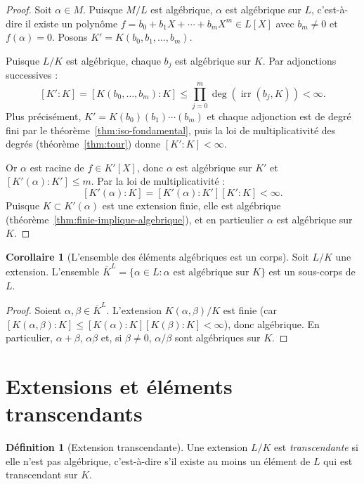 \documentclass[12pt,a4paper,openany]{book}
\theoremstyle{definition}
\newtheorem{definition}{Définition}[chapter]
\newtheorem{corollaire}{Corollaire}[chapter]
\newcommand{\irr}{\operatorname{irr}}
\renewcommand{\deg}{\operatorname{deg}}
\begin{document}
\begin{proof}
Soit $\alpha \in M$. Puisque $M/L$ est algébrique, $\alpha$ est algébrique sur
$L$, c'est-à-dire il existe un polynôme
$f = b_0 + b_1 X + \cdots + b_m X^m \in L[X]$ avec $b_m \neq 0$ et
$f(\alpha) = 0$. Posons $K' = K(b_0, b_1, \dots, b_m)$.

Puisque $L/K$ est algébrique, chaque $b_j$ est algébrique sur $K$. Par
adjonctions successives :
\[
  [K':K] = [K(b_0, \dots, b_m):K] \leq \prod_{j=0}^{m} \deg(\irr(b_j, K)) < \infty.
\]
Plus précisément, $K' = K(b_0)(b_1)\cdots(b_m)$ et chaque adjonction est de
degré fini par le théorème~\ref{thm:iso-fondamental}, puis la loi de
multiplicativité des degrés (théorème~\ref{thm:tour}) donne $[K':K] < \infty$.

Or $\alpha$ est racine de $f \in K'[X]$, donc $\alpha$ est algébrique sur $K'$
et $[K'(\alpha):K'] \leq m$. Par la loi de multiplicativité :
\[
  [K'(\alpha):K] = [K'(\alpha):K'][K':K] < \infty.
\]
Puisque $K \subset K'(\alpha)$ est une extension finie, elle est algébrique
(théorème~\ref{thm:finie-implique-algebrique}), et en particulier $\alpha$ est
algébrique sur $K$.
\end{proof}

\begin{corollaire}[L'ensemble des éléments algébriques est un corps]
\label{cor:elements-algebriques-corps}
Soit $L/K$ une extension. L'ensemble $\overline{K}^L = \{\alpha \in L :
\alpha \text{ est algébrique sur } K\}$ est un sous-corps de $L$.
\end{corollaire}

\begin{proof}
Soient $\alpha, \beta \in \overline{K}^L$. L'extension $K(\alpha,\beta)/K$ est
finie (car $[K(\alpha,\beta):K] \leq [K(\alpha):K][K(\beta):K] < \infty$), donc
algébrique. En particulier, $\alpha + \beta$, $\alpha\beta$ et, si
$\beta \neq 0$, $\alpha/\beta$ sont algébriques sur $K$.
\end{proof}

\section{Extensions et éléments transcendants}
\label{sec:transcendant}

\begin{definition}[Extension transcendante]\label{def:ext-transcendante}
Une extension $L/K$ est \emph{transcendante} si elle n'est pas algébrique,
c'est-à-dire s'il existe au moins un élément de $L$ qui est transcendant sur $K$.
\end{definition}
\end{document}
